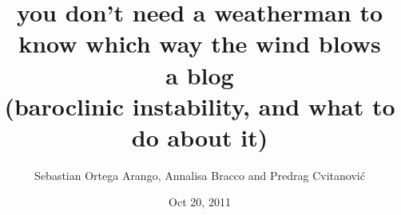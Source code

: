 
        \title{
\huge
you don't need a weatherman
to know which way the wind blows
\\ [4ex]
\Huge
a blog
\\
{\LARGE(baroclinic instability, and what to do about it)}
        \\\vspace{1.0cm}
        }\author{
Sebastian Ortega Arango, 
{Annalisa Bracco}
and
Predrag Cvitanovi\'{c}
    }
        \date{Oct 20, 2011} \Private{\date{\today}}
